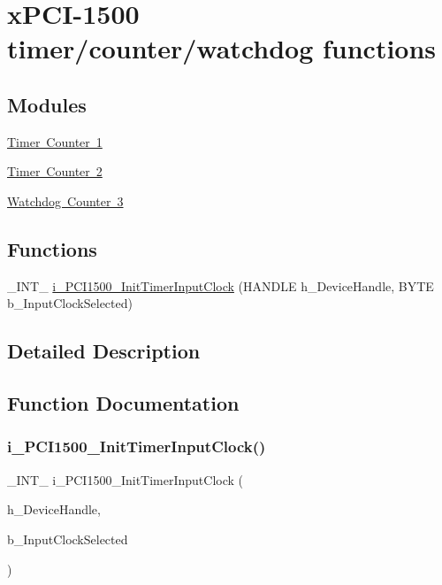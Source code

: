 \hypertarget{group___timer}{}\section{x\+P\+C\+I-\/1500 timer/counter/watchdog functions}
\label{group___timer}
\subsection*{Modules}
\begin{DoxyCompactItemize}
\item 
\mbox{\hyperlink{group___timer1}{Timer Counter 1}}
\item 
\mbox{\hyperlink{group___timer2}{Timer Counter 2}}
\item 
\mbox{\hyperlink{group___timer3}{Watchdog Counter 3}}
\end{DoxyCompactItemize}
\subsection*{Functions}
\begin{DoxyCompactItemize}
\item 
\+\_\+\+I\+N\+T\+\_\+ \mbox{\hyperlink{group___timer_ga0ebb52212b1a7c9d810bcb5a04308727}{i\+\_\+\+P\+C\+I1500\+\_\+\+Init\+Timer\+Input\+Clock}} (H\+A\+N\+D\+LE h\+\_\+\+Device\+Handle, B\+Y\+TE b\+\_\+\+Input\+Clock\+Selected)
\end{DoxyCompactItemize}


\subsection{Detailed Description}


\subsection{Function Documentation}
\mbox{\label{group___timer_ga0ebb52212b1a7c9d810bcb5a04308727}} 
\subsubsection{\texorpdfstring{i\_PCI1500\_InitTimerInputClock()}{i\_PCI1500\_InitTimerInputClock()}}
{\footnotesize\ttfamily \+\_\+\+I\+N\+T\+\_\+ i\+\_\+\+P\+C\+I1500\+\_\+\+Init\+Timer\+Input\+Clock (\begin{DoxyParamCaption}\item[{H\+A\+N\+D\+LE}]{h\+\_\+\+Device\+Handle,  }\item[{B\+Y\+TE}]{b\+\_\+\+Input\+Clock\+Selected }\end{DoxyParamCaption})}

